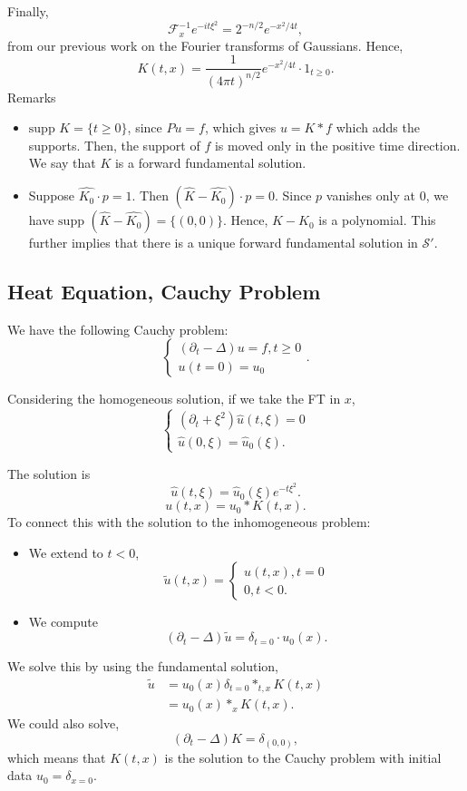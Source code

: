 \documentclass[11pt]{scrartcl}
\renewcommand{\hat}{\widehat}
\newcommand{\supp}{\text{supp }}
\begin{document}
Finally,
$$\mathcal F_x^{-1} e^{-it\xi^2} = 2^{-n/2}e^{-x^2/4t},$$
from our previous work on the Fourier transforms of Gaussians.  Hence,
$$K(t, x) = \frac{1}{(4\pi t)^{n/2}}e^{-x^2/4t} \cdot 1_{t \ge 0}.$$
Remarks
\begin{itemize}
 \item $\supp{K} = \{t \ge 0\}$, since $Pu = f$, which gives $u = K * f$ which adds the supports.  Then, the support of $f$ is moved only in the positive time direction.  We say that $K$ is a forward fundamental solution.
 \item Suppose $\hat{K_0} \cdot p = 1$.  Then $(\hat{K} - \hat{K_0})\cdot p = 0$.  Since $p$ vanishes only at $0
$, we have $\supp(\hat{K} - \hat{K_0}) = \{(0, 0)\}$.  Hence, $K - K_0$ is a polynomial.  This further implies that there is a unique forward fundamental solution in $\mathcal S'$.  
 \end{itemize} 
\subsection{Heat Equation, Cauchy Problem}
We have the following Cauchy problem:
$$\begin{cases}
(\partial_t - \Delta) u = f, t \ge 0 \\
u(t= 0) = u_0
\end{cases}.$$

Considering the homogeneous solution, if we take the FT in $x$, 
$$
\begin{cases}
(\partial_t + \xi^2) \hat{u}(t, \xi) = 0 \\
\hat{u}(0, \xi) = \hat{u}_0(\xi).
\end{cases}
$$

The solution is 
$$\hat{u}(t, \xi) = \hat{u}_0(\xi) e^{-t\xi^2}.$$
$$u(t, x) = u_0 * K(t, x).$$
To connect this with the solution to the inhomogeneous problem:
\begin{itemize}
\item We extend to $t < 0$, 
$$\tilde{u}(t, x) = \begin{cases}
u(t, x), t = 0 \\
0, t < 0.
\end{cases}$$
\item We compute 
$$(\partial_t - \Delta)\tilde{u} = \delta_{t = 0} \cdot u_0(x).$$
\end{itemize}

We solve this by using the fundamental solution,
\begin{align*}
\tilde{u} &= u_0(x) \delta_{t=0} *_{t, x} K(t, x) \\
&= u_0(x) *_x K(t, x).
\end{align*}
We could also solve,
$$(\partial_t - \Delta)K = \delta_{(0, 0)},$$
which means that $K(t, x)$ is the solution to the Cauchy problem with initial data $u_0 = \delta_{x = 0}$.
\end{document}
